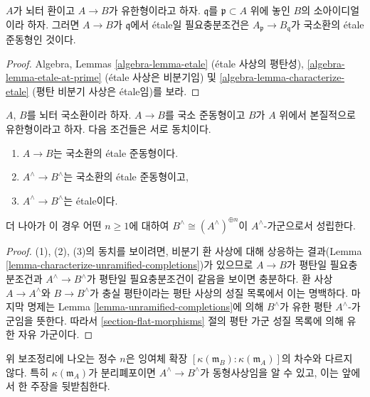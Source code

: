 \begin{lemma}
\label{lemma-characterize-etale-Noetherian}
$A$가 뇌터 환이고 $A \to B$가 유한형이라고 하자.
$\mathfrak q$를 $\mathfrak p \subset A$ 위에 놓인 $B$의 소아이디얼이라 하자.
그러면 $A \to B$가 $\mathfrak q$에서 \'etale일 필요충분조건은
$A_{\mathfrak p} \to B_{\mathfrak q}$가 국소환의
\'etale 준동형인 것이다.
\end{lemma}

\begin{proof}
Algebra, Lemmas \ref{algebra-lemma-etale} (\'etale 사상의 평탄성),
\ref{algebra-lemma-etale-at-prime} (\'etale 사상은 비분기임) 및
\ref{algebra-lemma-characterize-etale} (평탄 비분기 사상은
\'etale임)를 보라.
\end{proof}

\begin{lemma}
\label{lemma-characterize-etale-completions}
$A$, $B$를 뇌터 국소환이라 하자.
$A \to B$를 국소 준동형이고 $B$가 $A$ 위에서 본질적으로
유한형이라고 하자.
다음 조건들은 서로 동치이다.
\begin{enumerate}
\item $A \to B$는 국소환의 \'etale 준동형이다.
\item $A^\wedge \to B^\wedge$는 국소환의 \'etale 준동형이고,
\item $A^\wedge \to B^\wedge$는 \'etale이다.
\end{enumerate}
더 나아가 이 경우 어떤 $n \geq 1$에 대하여
$B^\wedge \cong (A^\wedge)^{\oplus n}$이
$A^\wedge$-가군으로서 성립한다.
\end{lemma}

\begin{proof}
(1), (2), (3)의 동치를 보이려면, 비분기 환 사상에 대해
상응하는 결과(Lemma \ref{lemma-characterize-unramified-completions})가
있으므로 $A \to B$가 평탄일 필요충분조건과
$A^\wedge \to B^\wedge$가 평탄일 필요충분조건이 같음을
보이면 충분하다.
환 사상 $A \to A^\wedge$와 $B \to B^\wedge$가 충실 평탄이라는
평탄 사상의 성질 목록에서 이는 명백하다.
마지막 명제는 Lemma \ref{lemma-unramified-completions}에 의해
$B^\wedge$가 유한 평탄 $A^\wedge$-가군임을 뜻한다.
따라서 \ref{section-flat-morphisms} 절의 평탄 가군 성질 목록에
의해 유한 자유 가군이다.
\end{proof}

\noindent
위 보조정리에 나오는 정수 $n$은 잉여체 확장
$[\kappa(\mathfrak m_B) : \kappa(\mathfrak m_A)]$의 차수와
다르지 않다. 특히 $\kappa(\mathfrak m_A)$가 분리폐포이면
$A^\wedge \to B^\wedge$가 동형사상임을 알 수 있고,
이는 앞에서 한 주장을 뒷받침한다.

